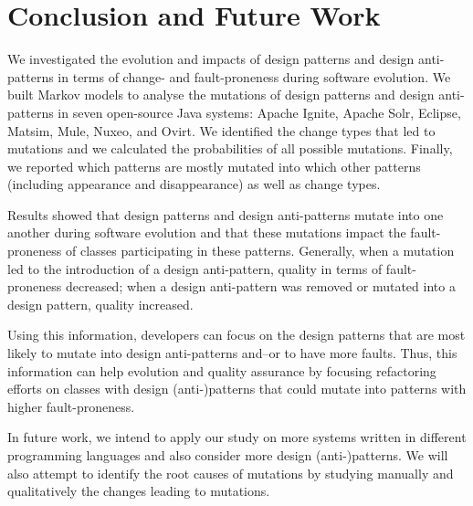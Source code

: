 \section{Conclusion and Future Work}
\label{sec:Conclusion and Future Work}

We investigated the evolution and impacts of design patterns and design anti-patterns in terms of change- and fault-proneness during software evolution. We built Markov models to analyse the mutations of design patterns and design anti-patterns in seven open-source Java systems: Apache Ignite, Apache Solr, Eclipse, Matsim, Mule, Nuxeo, and Ovirt. We identified the change types that led to mutations and we calculated the probabilities of all possible mutations. Finally, we reported which patterns are mostly mutated into which other patterns (including appearance and disappearance) as well as change types.

Results showed that design patterns and design anti-patterns mutate into one another during software evolution and that these mutations impact the fault-proneness of classes participating in these patterns. Generally, when a mutation led to the introduction of a design anti-pattern, quality in terms of fault-proneness decreased; when a design anti-pattern was removed or mutated into a design pattern,  quality increased.

Using this information, developers can focus on the design patterns that are most likely to mutate into design anti-patterns and--or to have more faults. Thus, this information can help evolution and quality assurance by focusing refactoring efforts on classes with design (anti-)patterns that could mutate into patterns with higher fault-proneness.

In future work, we intend to apply our study on more systems written in different programming languages and also consider more design (anti-)patterns. We will also attempt to identify the root causes of mutations by studying manually and qualitatively the changes leading to mutations.
